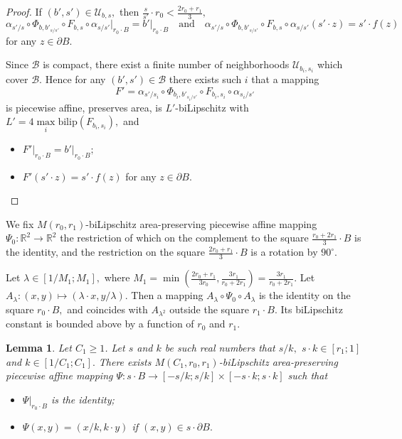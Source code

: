 \documentclass[12pt]{article}
\newtheorem{lemm}[prop]{Lemma}
\theoremstyle{definition}
\begin{document}
\begin{proof}
If $(b',s')\in \mathcal U_{b,s},$ then $\frac{s}{s'}\cdot r_0 < \frac{2r_0+r_1}3,$
$$
\alpha_{s'/s}\circ \Phi_{b,b'_{s/s'}}\circ F_{b,s}\circ\alpha_{s/s'}\big|_{r_0\cdot B} = b'\big|_{r_0\cdot B}
\quad\text{and}\quad
\alpha_{s'/s}\circ \Phi_{b,b'_{s/s'}}\circ F_{b,s}\circ\alpha_{s/s'}(s'\cdot z) = s'\cdot f(z)
$$
for any $z\in\partial B.$

Since $\mathcal B$ is compact, there exist a finite number of neighborhoods $\mathcal U_{b_i,s_i}$ which cover $\mathcal B.$ Hence for any $(b',s')\in\mathcal B$ there exists such $i$ that a mapping
$$
F' = \alpha_{s'/s_i}\circ \Phi_{b_i,b'_{s_i/s'}}\circ F_{b_i,s_i}\circ\alpha_{s_i/s'}
$$
is piecewise affine, preserves area, is $L'$-biLipschitz with $L' = 4\max\limits_i\mathrm{bilip}(F_{b_i,s_i}),$ and
\begin{itemize}
\item $F'\big|_{r_0\cdot B} = b'\big|_{r_0\cdot B};$
\item $F'(s'\cdot z) = s'\cdot f(z)$ for any $z\in\partial B.$
\end{itemize}
\end{proof}

We fix $M(r_0,r_1)$-biLipschitz area-preserving piecewise affine mapping $\Psi_0:\mathbb R^2\to \mathbb R^2$ the restriction of which on the complement to the square $\frac{r_0+2r_1}3\cdot B$ is the identity, and the restriction on the square $\frac{2r_0+r_1}3\cdot B$ is a rotation by $90^{\circ}.$

Let $\lambda\in [1/M_1;M_1],$ where $M_1 = \min\left(\frac{2r_0+r_1}{3r_0}, \frac{3r_1}{r_0+2r_1} \right) = \frac{3r_1}{r_0+2r_1}.$ Let $A_{\lambda}:(x,y)\mapsto (\lambda\cdot x, y/\lambda).$ Then a mapping $A_{\lambda}\circ\Psi_0\circ A_{\lambda}$ is the identity on the square $r_0\cdot B,$ and coincides with $A_{\lambda^2}$ outside the square $r_1\cdot B.$ Its biLipschitz constant is bounded above by a function of $r_0$ and $r_1.$

\begin{lemm}\label{square-to-rectangle}
Let $C_1\ge 1$. Let $s$ and $k$ be such real numbers that $s/k,$ $s\cdot k\in[r_1;1]$ and $k\in[1/C_1;C_1].$ There exists $M(C_1,r_0,r_1)$-biLipschitz area-preserving piecewise affine mapping $\Psi: s\cdot B\to [-s/k;s/k]\times[-s\cdot k;s\cdot k]$ such that
\begin{itemize}
\item $\Psi\big|_{r_0\cdot B}$ is the identity;
\item $\Psi(x,y) = (x/k, k\cdot y)$ if $(x,y)\in s\cdot \partial B.$
\end{itemize}
\end{lemm}
\end{document}
